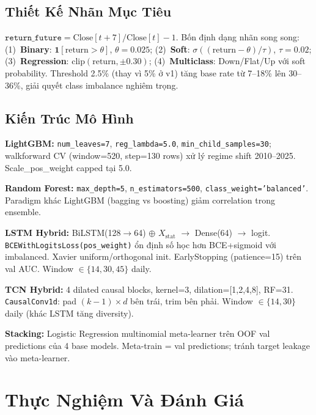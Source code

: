 \documentclass[conference]{IEEEtran}
\begin{document}
\subsection{Thiết Kế Nhãn Mục Tiêu}

$\texttt{return\_future} = \text{Close}[t+7]/\text{Close}[t] - 1$.
Bốn định dạng nhãn song song:
(1)~\textbf{Binary}: $\mathbf{1}[\text{return} > \theta]$, $\theta = 0.025$;
(2)~\textbf{Soft}: $\sigma((\text{return}-\theta)/\tau)$, $\tau=0.02$;
(3)~\textbf{Regression}: $\text{clip}(\text{return}, \pm 0.30)$;
(4)~\textbf{Multiclass}: Down/Flat/Up với soft probability.
Threshold 2.5\% (thay vì 5\% ở v1) tăng base rate từ 7--18\% lên 30--36\%,
giải quyết class imbalance nghiêm trọng.

\subsection{Kiến Trúc Mô Hình}

\textbf{LightGBM:} \texttt{num\_leaves=7}, \texttt{reg\_lambda=5.0},
\texttt{min\_child\_samples=30}; walkforward CV (window=520, step=130 rows)
xử lý regime shift 2010--2025. Scale\_pos\_weight capped tại 5.0.

\textbf{Random Forest:} \texttt{max\_depth=5}, \texttt{n\_estimators=500},
\texttt{class\_weight='balanced'}. Paradigm khác LightGBM (bagging vs
boosting) giảm correlation trong ensemble.

\textbf{LSTM Hybrid:} BiLSTM(128$\to$64) $\oplus$ $X_\text{stat}$
$\to$ Dense(64) $\to$ logit. \texttt{BCEWithLogitsLoss(pos\_weight)} ổn định
số học hơn BCE+sigmoid với imbalanced. Xavier uniform/orthogonal init.
EarlyStopping (patience=15) trên val AUC. Window $\in \{14,30,45\}$ daily.

\textbf{TCN Hybrid:} 4 dilated causal blocks, kernel=3, dilation=[1,2,4,8],
RF=31. \texttt{CausalConv1d}: pad $(k{-}1){\times}d$ bên trái, trim bên
phải. Window $\in \{14,30\}$ daily (khác LSTM tăng diversity).

\textbf{Stacking:} Logistic Regression multinomial meta-learner trên OOF val
predictions của 4 base models. Meta-train = val predictions; tránh target
leakage vào meta-learner.

\section{Thực Nghiệm Và Đánh Giá}
\end{document}
